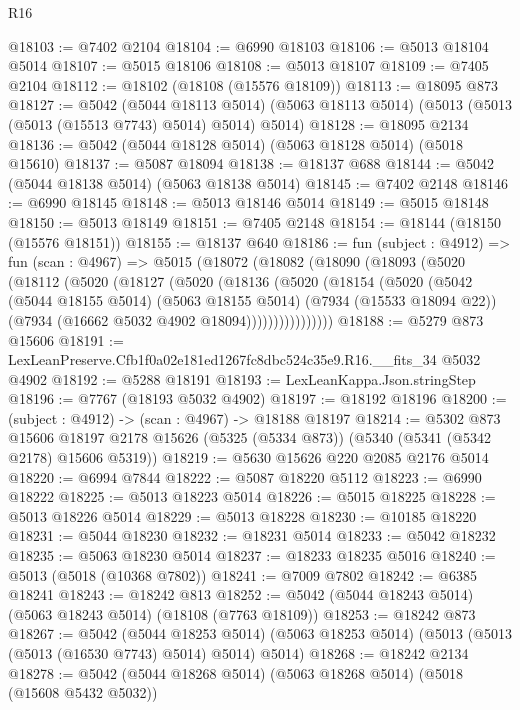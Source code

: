 \begin{lexlean}{R16}
\begin{coremodule}
@18103 := @7402 @2104
@18104 := @6990 @18103
@18106 := @5013 @18104 @5014
@18107 := @5015 @18106
@18108 := @5013 @18107
@18109 := @7405 @2104
@18112 := @18102 (@18108 (@15576 @18109))
@18113 := @18095 @873
@18127 := @5042
    (@5044 @18113 @5014)
    (@5063 @18113 @5014)
    (@5013 (@5013 (@5013 (@15513 @7743) @5014) @5014) @5014)
@18128 := @18095 @2134
@18136 := @5042 (@5044 @18128 @5014) (@5063 @18128 @5014) (@5018 @15610)
@18137 := @5087 @18094
@18138 := @18137 @688
@18144 := @5042 (@5044 @18138 @5014) (@5063 @18138 @5014)
@18145 := @7402 @2148
@18146 := @6990 @18145
@18148 := @5013 @18146 @5014
@18149 := @5015 @18148
@18150 := @5013 @18149
@18151 := @7405 @2148
@18154 := @18144 (@18150 (@15576 @18151))
@18155 := @18137 @640
@18186 := fun (subject : @4912) =>
  fun (scan : @4967) =>
  @5015
    (@18072
      (@18082
        (@18090
          (@18093
            (@5020
              (@18112
                (@5020
                  (@18127
                    (@5020
                      (@18136
                        (@5020
                          (@18154
                            (@5020
                              (@5042
                                (@5044 @18155 @5014)
                                (@5063 @18155 @5014)
                                (@7934 (@15533 @18094 @22))
                                (@7934 (@16662 @5032 @4902 @18094))))))))))))))))
@18188 := @5279 @873 @15606
@18191 := LexLeanPreserve.Cfb1f0a02e181ed1267fc8dbc524c35e9.R16.__fits_34 @5032 @4902
@18192 := @5288 @18191
@18193 := LexLeanKappa.Json.stringStep
@18196 := @7767 (@18193 @5032 @4902)
@18197 := @18192 @18196
@18200 := (subject : @4912) -> (scan : @4967) -> @18188 @18197
@18214 := @5302
    @873
    @15606
    @18197
    @2178
    @15626
    (@5325 (@5334 @873))
    (@5340 (@5341 (@5342 @2178) @15606 @5319))
@18219 := @5630 @15626 @220 @2085 @2176 @5014
@18220 := @6994 @7844
@18222 := @5087 @18220 @5112
@18223 := @6990 @18222
@18225 := @5013 @18223 @5014
@18226 := @5015 @18225
@18228 := @5013 @18226 @5014
@18229 := @5013 @18228
@18230 := @10185 @18220
@18231 := @5044 @18230
@18232 := @18231 @5014
@18233 := @5042 @18232
@18235 := @5063 @18230 @5014
@18237 := @18233 @18235 @5016
@18240 := @5013 (@5018 (@10368 @7802))
@18241 := @7009 @7802
@18242 := @6385 @18241
@18243 := @18242 @813
@18252 := @5042 (@5044 @18243 @5014) (@5063 @18243 @5014) (@18108 (@7763 @18109))
@18253 := @18242 @873
@18267 := @5042
    (@5044 @18253 @5014)
    (@5063 @18253 @5014)
    (@5013 (@5013 (@5013 (@16530 @7743) @5014) @5014) @5014)
@18268 := @18242 @2134
@18278 := @5042 (@5044 @18268 @5014) (@5063 @18268 @5014) (@5018 (@15608 @5432 @5032))

\end{coremodule}
\end{lexlean}

